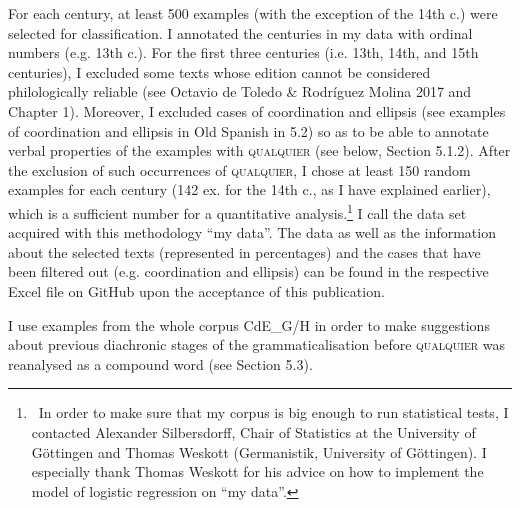 \begin{styleStandard}
For each century, at least 500 examples (with the exception of the 14th c.) were selected for classification. I annotated the centuries in my data with ordinal numbers (e.g. 13th c.). For the first three centuries (i.e. 13th, 14th, and 15th centuries), I excluded some texts whose edition cannot be considered philologically reliable (see Octavio de Toledo \& Rodríguez Molina 2017 and Chapter 1). Moreover, I excluded cases of coordination and ellipsis (see examples of coordination and ellipsis in Old Spanish in 5.2) so as to be able to annotate verbal properties of the examples with \textsc{qualquier} (see below, Section 5.1.2). After the exclusion of such occurrences of \textsc{qualquier}, I chose at least 150 random examples for each century (142 ex. for the 14th c., as I have explained earlier), which is a sufficient number for a quantitative analysis.\footnote{\ \textrm{In order to make sure that my corpus is big enough to run statistical tests, I contacted} \textrm{Alexander Silbersdorff, Chair of Statistics at the University of Göttingen and Thomas Weskott (Germanistik, University of Göttingen). I especially thank Thomas Weskott for his advice on how to implement the model of logistic regression on “my data”.}} I call the data set acquired with this methodology “my data”. The data as well as the information about the selected texts (represented in percentages) and the cases that have been filtered out (e.g. coordination and ellipsis) can be found in the respective Excel file on GitHub upon the acceptance of this publication.
\end{styleStandard}

\begin{styleStandard}
I use examples from the whole corpus CdE\_G/H in order to make suggestions about previous diachronic stages of the grammaticalisation before \textsc{qualquier} was reanalysed as a compound word (see Section 5.3). 
\end{styleStandard}

